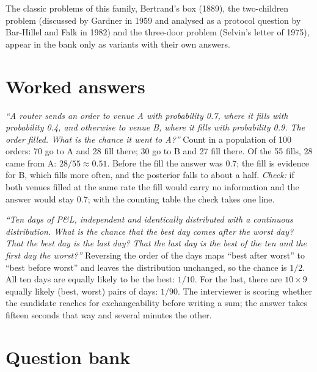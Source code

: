 The classic problems of this family, Bertrand's box (1889), the two-children problem (discussed by Gardner in
1959 and analysed as a protocol question by Bar-Hillel and Falk in 1982) and the three-door problem (Selvin's
letter of 1975), appear in the bank only as variants with their own answers.

\section{Worked answers}

\begin{example}\label{ex:iv:probability-i:venue}
\emph{``A router sends an order to venue A with probability 0.7, where it fills with probability 0.4, and otherwise to
venue B, where it fills with probability 0.9. The order filled. What is the chance it went to A?''} Count in a
population of 100 orders: 70 go to A and 28 fill there; 30 go to B and 27 fill there. Of the 55 fills, 28 came from A:
$28/55 \approx 0.51$. Before the fill the answer was 0.7; the fill is evidence for B, which fills more often, and the
posterior falls to about a half. \emph{Check:} if both venues filled at the same rate the fill would carry no
information and the answer would stay 0.7; with the counting table the check takes one line.
\end{example}

\begin{example}\label{ex:iv:probability-i:order}
\emph{``Ten days of P\&L, independent and identically distributed with a continuous distribution. What is the chance
that the best day comes after the worst day? That the best day is the last day? That the last day is the best of the
ten and the first day the worst?''} Reversing the order of the days maps ``best after worst'' to ``best before worst''
and leaves the distribution unchanged, so the chance is $1/2$. All ten days are equally likely to be the best: $1/10$.
For the last, there are $10 \times 9$ equally likely (best, worst) pairs of days: $1/90$. The interviewer is scoring
whether the candidate reaches for exchangeability before writing a sum; the answer takes fifteen seconds that way and
several minutes the other.
\end{example}

\section{Question bank}

